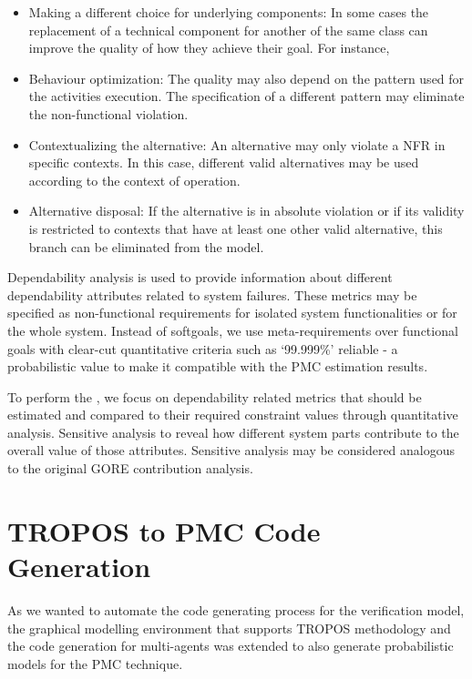 \begin{itemize}

\item Making a different choice for underlying components: In some cases the replacement of a technical component for another of the same class can improve the quality of how they achieve their goal. For instance,
\medskip

\item Behaviour optimization: The quality may also depend on the pattern used for the activities execution. The specification of a different pattern may eliminate the non-functional violation. 
\medskip

\item Contextualizing the alternative: An alternative may only violate a NFR in specific contexts. In this case, different valid alternatives may be used according to the context of operation.
\medskip

\item Alternative disposal: If the alternative is in absolute violation or if its validity is restricted to contexts that have at least one other valid alternative, this branch can be eliminated from the model.

\end{itemize}

Dependability analysis is used to provide information about different dependability attributes related to system failures. These metrics may be specified as non-functional requirements for isolated system functionalities or for the whole system. Instead of softgoals, we use meta-requirements over functional goals with clear-cut quantitative criteria such as `99.999\%' reliable - a probabilistic value to make it compatible with the PMC estimation results.

To perform the , we focus on dependability related metrics that should be estimated and compared to their required constraint values through quantitative analysis. Sensitive analysis to reveal how different system parts contribute to the overall value of those attributes. Sensitive analysis may be considered analogous to the original GORE contribution analysis.



\section{TROPOS to PMC Code Generation}

As we wanted to automate the code generating process for the verification model, the graphical modelling environment that supports TROPOS methodology and the code generation for multi-agents was extended to also generate probabilistic models for the PMC technique.

